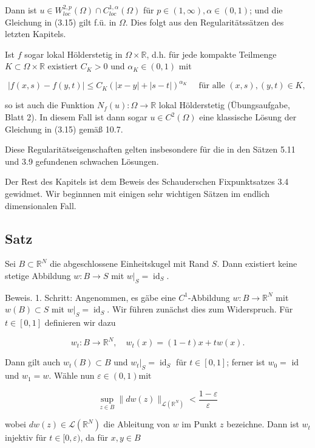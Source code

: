 \documentclass[10pt, letterpaper]{article}
\begin{document}
Dann ist $u \in W_{l o c}^{2, p}(\Omega) \cap C_{l o c}^{1, \alpha}(\Omega)$ für $p \in(1, \infty), \alpha \in(0,1)$; und die Gleichung in (3.15) gilt f.ü. in $\Omega$. Dies folgt aus den Regularitätssätzen des letzten Kapitels.

Ist $f$ sogar lokal Hölderstetig in $\Omega \times \mathbb{R}$, d.h. für jede kompakte Teilmenge $K \subset \Omega \times \mathbb{R}$ existiert $C_{K}>0$ und $\alpha_{K} \in(0,1)$ mit

$$
|f(x, s)-f(y, t)| \leq C_{K}(|x-y|+|s-t|)^{\alpha_{K}} \quad \text { für alle }(x, s),(y, t) \in K \text {, }
$$

so ist auch die Funktion $N_{f}(u): \Omega \rightarrow \mathbb{R}$ lokal Hölderstetig (Übungsaufgabe, Blatt 2). In diesem Fall ist dann sogar $u \in C^{2}(\Omega)$ eine klassische Lösung der Gleichung in (3.15) gemäß 10.7.

Diese Regularitätseigenschaften gelten insbesondere für die in den Sätzen 5.11 und 3.9 gefundenen schwachen Lösungen.

Der Rest des Kapitels ist dem Beweis des Schauderschen Fixpunktsatzes 3.4 gewidmet. Wir beginnnen mit einigen sehr wichtigen Sätzen im endlich dimensionalen Fall.

\subsection*{Satz}

Sei $B \subset \mathbb{R}^{N}$ die abgeschlossene Einheitskugel mit Rand $S$. Dann existiert keine stetige Abbildung $w: B \rightarrow S$ mit $\left.w\right|_{S}=\operatorname{id}_{S}$.

Beweis. 1. Schritt: Angenommen, es gäbe eine $C^{1}$-Abbildung $w: B \rightarrow \mathbb{R}^{N}$ mit $w(B) \subset S$ mit $\left.w\right|_{S}=\operatorname{id}_{S}$. Wir führen zunächst dies zum Widerspruch. Für $t \in[0,1]$ definieren wir dazu

$$
w_{t}: B \rightarrow \mathbb{R}^{N}, \quad w_{t}(x)=(1-t) x+t w(x) .
$$

Dann gilt auch $w_{t}(B) \subset B$ und $\left.w_{t}\right|_{S}=\operatorname{id}_{S}$ für $t \in[0,1]$; ferner ist $w_{0}=$ id und $w_{1}=w$. Wähle nun $\varepsilon \in(0,1) \mathrm{mit}$

$$
\sup _{z \in B}\|d w(z)\|_{\mathcal{L}\left(\mathbb{R}^{N}\right)}<\frac{1-\varepsilon}{\varepsilon}
$$

wobei $d w(z) \in \mathcal{L}\left(\mathbb{R}^{N}\right)$ die Ableitung von $w$ im Punkt $z$ bezeichne. Dann ist $w_{t}$ injektiv für $t \in[0, \varepsilon)$, da für $x, y \in B$
\end{document}
